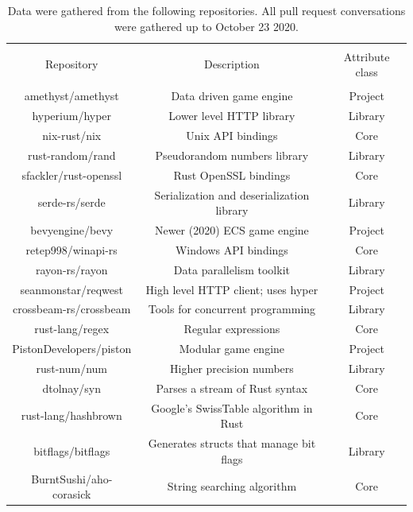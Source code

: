 \documentclass[12pt, a4paper]{article}
\begin{document}
\begin{table}
    \centering
    \begin{tabular}{ccc}
        \hline\\
        Repository & Description & Attribute class\\
        \hline\\
        amethyst/amethyst & Data driven game engine & Project\\
        hyperium/hyper & Lower level HTTP library & Library\\
        nix-rust/nix & Unix API bindings & Core\\
        rust-random/rand & Pseudorandom numbers library & Library\\
        sfackler/rust-openssl & Rust OpenSSL bindings & Core\\
        serde-rs/serde & Serialization and deserialization library & Library\\
        bevyengine/bevy & Newer (2020) ECS game engine & Project\\
        retep998/winapi-rs & Windows API bindings & Core\\
        rayon-rs/rayon & Data parallelism toolkit & Library\\
        seanmonstar/reqwest & High level HTTP client; uses hyper & Project\\
        crossbeam-rs/crossbeam & Tools for concurrent programming & Library\\
        rust-lang/regex & Regular expressions & Core\\
        PistonDevelopers/piston & Modular game engine & Project\\
        rust-num/num & Higher precision numbers & Library\\
        dtolnay/syn & Parses a stream of Rust syntax & Core\\
        rust-lang/hashbrown & Google's SwissTable algorithm in Rust & Core\\
        bitflags/bitflags & Generates structs that manage bit flags & Library\\
        BurntSushi/aho-corasick & String searching algorithm & Core\\
        \hline
    \end{tabular}
    \caption{Data were gathered from the following repositories. All pull request conversations were gathered up to October 23 2020.}
    \label{tab:repoinfo}
\end{table}
\end{document}
